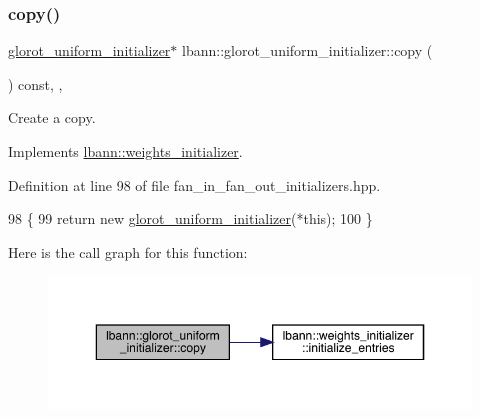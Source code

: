 \subsubsection{\texorpdfstring{copy()}{copy()}}
{\footnotesize\ttfamily \hyperlink{classlbann_1_1glorot__uniform__initializer}{glorot\+\_\+uniform\+\_\+initializer}$\ast$ lbann\+::glorot\+\_\+uniform\+\_\+initializer\+::copy (\begin{DoxyParamCaption}{ }\end{DoxyParamCaption}) const\hspace{0.3cm}{\ttfamily [inline]}, {\ttfamily [override]}, {\ttfamily [virtual]}}

Create a copy. 

Implements \hyperlink{classlbann_1_1weights__initializer_acc84ce49188b74b23987cef3db18525a}{lbann\+::weights\+\_\+initializer}.



Definition at line 98 of file fan\+\_\+in\+\_\+fan\+\_\+out\+\_\+initializers.\+hpp.


\begin{DoxyCode}
98                                                     \{
99     \textcolor{keywordflow}{return} \textcolor{keyword}{new} \hyperlink{classlbann_1_1glorot__uniform__initializer_a1958289232a04f13ce340a684620be55}{glorot\_uniform\_initializer}(*\textcolor{keyword}{this});
100   \}
\end{DoxyCode}
Here is the call graph for this function\+:\nopagebreak
\begin{figure}[H]
\begin{center}
\leavevmode
\includegraphics[width=350pt]{classlbann_1_1glorot__uniform__initializer_a3c5790bf2e7b0e771d3ed1d93c8f255f_cgraph}
\end{center}
\end{figure}
\mbox{\label{classlbann_1_1glorot__uniform__initializer_a3a44410934f791cee272183a6a36ae0c}} 
